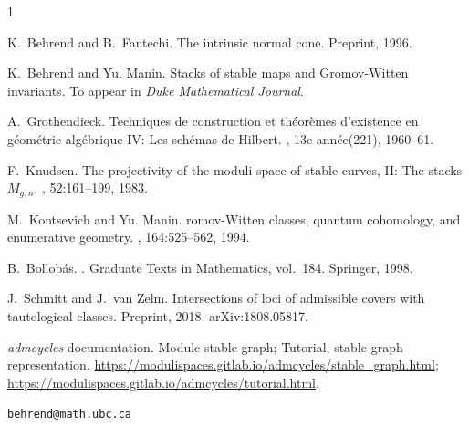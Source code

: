 \documentclass[11pt]{article}
\theoremstyle{plain}
\theoremstyle{remark}
\theoremstyle{plain}
\theoremstyle{definition}
\theoremstyle{remark}
\begin{document}
\begin{thebibliography}{1}

K.~Behrend and B.~Fantechi.
\newblock The intrinsic normal cone.
\newblock Preprint, 1996.

K.~Behrend and Yu. Manin.
\newblock Stacks of stable maps and {G}romov-{W}itten invariants.
\newblock To appear in {\em Duke Mathematical Journal}.

A.~Grothendieck.
\newblock Techniques de construction et th\'eor\`emes d'existence en
  g\'eom\'etrie alg\'ebrique {IV}: Les sch\'emas de {H}ilbert.
, 13e ann\'ee(221), 1960--61.

F.~Knudsen.
\newblock The projectivity of the moduli space of stable curves, {I}{I}: The
  stacks \({M}_{g,n}\).
, 52:161--199, 1983.

M.~Kontsevich and Yu. Manin.
romov-{W}itten classes, quantum cohomology, and enumerative
  geometry.
, 164:525--562, 1994.

B.~Bollob\'as.
.
\newblock Graduate Texts in Mathematics, vol.~184. Springer, 1998.

J.~Schmitt and J.~van Zelm.
\newblock Intersections of loci of admissible covers with tautological classes.
\newblock Preprint, 2018. arXiv:1808.05817.

\emph{admcycles} documentation.
\newblock Module stable graph; Tutorial, stable-graph representation.
\newblock \url{https://modulispaces.gitlab.io/admcycles/stable_graph.html};
\url{https://modulispaces.gitlab.io/admcycles/tutorial.html}.
\end{thebibliography}

\begin{flushleft}
{\tt behrend@math.ubc.ca}
\end{flushleft}
\end{document}
